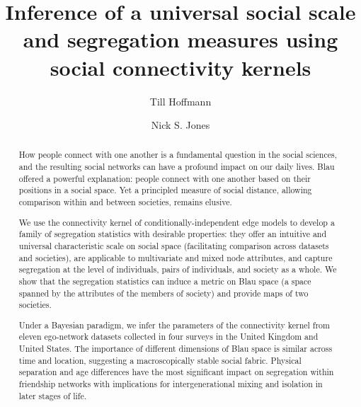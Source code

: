 \documentclass{scrartcl}
\title{Inference of a universal social scale and segregation measures using social connectivity kernels}
\author{Till Hoffmann}
\author{Nick S. Jones}
\affil{Department of Mathematics, Imperial College London}
\date{}
\begin{document}
\maketitle

\begin{abstract} %
    How people connect with one another is a fundamental question in the social sciences, and the resulting social networks can have a profound impact on our daily lives. Blau offered a powerful explanation: people connect with one another based on their positions in a social space. Yet a principled measure of social distance, allowing comparison within and between societies, remains elusive.

    We use the connectivity kernel of conditionally-independent edge models to develop a family of segregation statistics with desirable properties: they offer an intuitive and universal characteristic scale on social space (facilitating comparison across datasets and societies), are applicable to multivariate and mixed node attributes, and capture segregation at the level of individuals, pairs of individuals, and society as a whole. We show that the segregation statistics can induce a metric on Blau space (a space spanned by the attributes of the members of society) and provide maps of two societies.

    Under a Bayesian paradigm, we infer the parameters of the connectivity kernel from eleven ego-network datasets collected in four surveys in the United Kingdom and United States. The importance of different dimensions of Blau space is similar across time and location, suggesting a macroscopically stable social fabric. Physical separation and age differences have the most significant impact on segregation within friendship networks with implications for intergenerational mixing and isolation in later stages of life.
\end{abstract}
\end{document}
